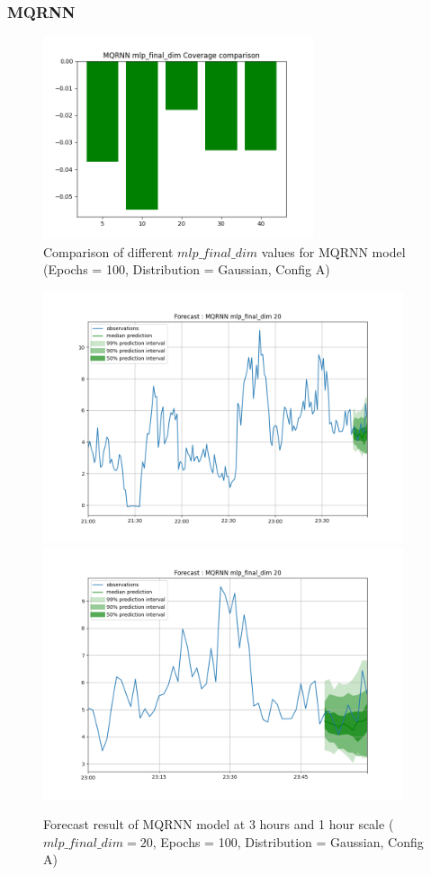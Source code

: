 \subsubsection{MQRNN} \label{comp_mqrnn}

\begin{figure}[H]
    \centering
    \includegraphics[width=300px]{plots/hist/a/MQRNN/mlp_final_dim/Coverage.png}
    \caption{Comparison of different $mlp\_final\_dim$ values for MQRNN model (Epochs = 100, Distribution = Gaussian, Config A)}
    \label{fig:comp_mqrnn}
\end{figure}

\begin{figure}[H]
    \centering
    \includegraphics[width=400px]{plots/forecast/a/MQRNN/mlp_final_dim/20/180.png}
    \includegraphics[width=400px]{plots/forecast/a/MQRNN/mlp_final_dim/20/60.png}
    \caption{Forecast result of MQRNN model at 3 hours and 1 hour scale ($mlp\_final\_dim = 20 $, Epochs = 100, Distribution = Gaussian, Config A)}
    \label{fig:mqrnn}
\end{figure}


